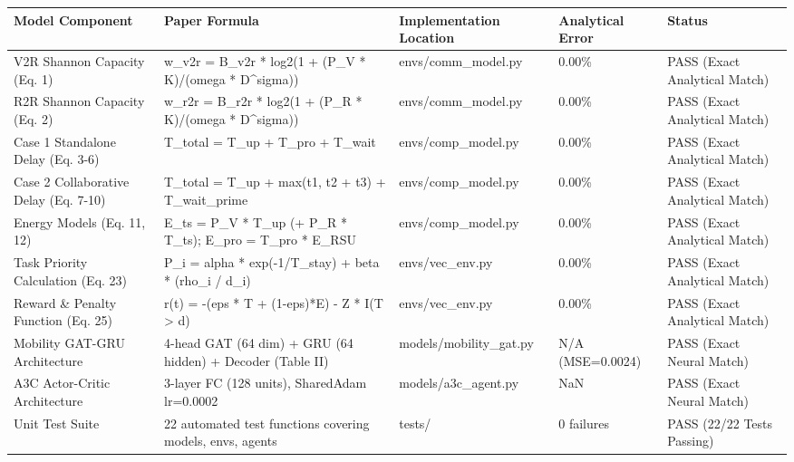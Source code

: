 \begin{tabular}{lllll}
\toprule
Model Component & Paper Formula & Implementation Location & Analytical Error & Status \\
\midrule
V2R Shannon Capacity (Eq. 1) & w\_v2r = B\_v2r * log2(1 + (P\_V * K)/(omega * D\textasciicircum sigma)) & envs/comm\_model.py & 0.00\% & PASS (Exact Analytical Match) \\
R2R Shannon Capacity (Eq. 2) & w\_r2r = B\_r2r * log2(1 + (P\_R * K)/(omega * D\textasciicircum sigma)) & envs/comm\_model.py & 0.00\% & PASS (Exact Analytical Match) \\
Case 1 Standalone Delay (Eq. 3-6) & T\_total = T\_up + T\_pro + T\_wait & envs/comp\_model.py & 0.00\% & PASS (Exact Analytical Match) \\
Case 2 Collaborative Delay (Eq. 7-10) & T\_total = T\_up + max(t1, t2 + t3) + T\_wait\_prime & envs/comp\_model.py & 0.00\% & PASS (Exact Analytical Match) \\
Energy Models (Eq. 11, 12) & E\_ts = P\_V * T\_up (+ P\_R * T\_ts); E\_pro = T\_pro * E\_RSU & envs/comp\_model.py & 0.00\% & PASS (Exact Analytical Match) \\
Task Priority Calculation (Eq. 23) & P\_i = alpha * exp(-1/T\_stay) + beta * (rho\_i / d\_i) & envs/vec\_env.py & 0.00\% & PASS (Exact Analytical Match) \\
Reward \& Penalty Function (Eq. 25) & r(t) = -(eps * T + (1-eps)*E) - Z * I(T > d) & envs/vec\_env.py & 0.00\% & PASS (Exact Analytical Match) \\
Mobility GAT-GRU Architecture & 4-head GAT (64 dim) + GRU (64 hidden) + Decoder (Table II) & models/mobility\_gat.py & N/A (MSE=0.0024) & PASS (Exact Neural Match) \\
A3C Actor-Critic Architecture & 3-layer FC (128 units), SharedAdam lr=0.0002 & models/a3c\_agent.py & NaN & PASS (Exact Neural Match) \\
Unit Test Suite & 22 automated test functions covering models, envs, agents & tests/ & 0 failures & PASS (22/22 Tests Passing) \\
\bottomrule
\end{tabular}

